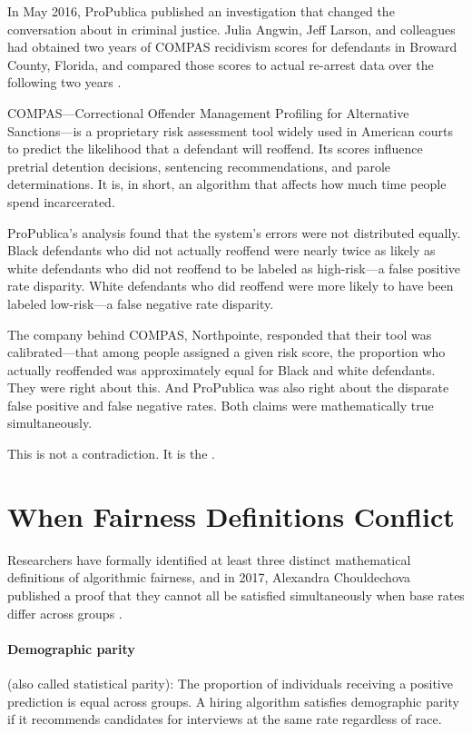 In May 2016, ProPublica published an investigation that changed the conversation about \ai in criminal justice. Julia Angwin, Jeff Larson, and colleagues had obtained two years of COMPAS recidivism scores for defendants in Broward County, Florida, and compared those scores to actual re-arrest data over the following two years \autocite{angwin2016machine}.

COMPAS---Correctional Offender Management Profiling for Alternative Sanctions---is a proprietary risk assessment tool widely used in American courts to predict the likelihood that a defendant will reoffend. Its scores influence pretrial detention decisions, sentencing recommendations, and parole determinations. It is, in short, an algorithm that affects how much time people spend incarcerated.

ProPublica's analysis found that the system's errors were not distributed equally. Black defendants who did not actually reoffend were nearly twice as likely as white defendants who did not reoffend to be labeled as high-risk---a false positive rate disparity. White defendants who did reoffend were more likely to have been labeled low-risk---a false negative rate disparity.

The company behind COMPAS, Northpointe, responded that their tool was calibrated---that among people assigned a given risk score, the proportion who actually reoffended was approximately equal for Black and white defendants. They were right about this. And ProPublica was also right about the disparate false positive and false negative rates. Both claims were mathematically true simultaneously.

This is not a contradiction. It is the .

\section{When Fairness Definitions Conflict}
\label{sec:ch14-fairness-definitions}

Researchers have formally identified at least three distinct mathematical definitions of algorithmic fairness, and in 2017, Alexandra Chouldechova published a proof that they cannot all be satisfied simultaneously when base rates differ across groups \autocite{chouldechova2017fair}.

\paragraph{Demographic parity} (also called statistical parity): The proportion of individuals receiving a positive prediction is equal across groups. A hiring algorithm satisfies demographic parity if it recommends candidates for interviews at the same rate regardless of race.

